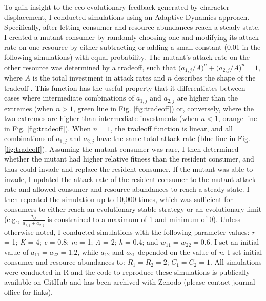 \documentclass[11pt,]{article}
\begin{document}
To gain insight to the eco-evolutionary feedback generated by character
displacement, I conducted simulations using an Adaptive Dynamics
approach. Specifically, after letting consumer and resource abundances
reach a steady state, I created a mutant consumer by randomly choosing
one and modifying its attack rate on one resource by either subtracting
or adding a small constant (0.01 in the following simulations) with
equal probability. The mutant's attack rate on the other resource was
determined by a tradeoff, such that
\(\big(a_{\text{1},j}/{A}\big)^n+\big(a_{\text{2},j}/{A}\big)^n=1\),
where \(A\) is the total investment in attack rates and \(n\) describes
the shape of the tradeoff \citep{Sargent2006}. This function has the
useful property that it differentiates between cases where intermediate
combinations of \(a_{\text{1},j}\) and \(a_{\text{2},j}\) are higher
than the extremes (when \(n>1\), green line in Fig. \ref{fig:tradeoff})
or, conversely, where the two extremes are higher than intermediate
investments (when \(n<1\), orange line in Fig. \ref{fig:tradeoff}). When
\(n=1\), the tradeoff function is linear, and all combinations of
\(a_{\text{1},j}\) and \(a_{\text{2},j}\) have the same total attack
rate (blue line in Fig. \ref{fig:tradeoff}). Assuming the mutant
consumer was rare, I then determined whether the mutant had higher
relative fitness than the resident consumer, and thus could invade and
replace the resident consumer. If the mutant was able to invade, I
updated the attack rate of the resident consumer to the mutant attack
rate and allowed consumer and resource abundances to reach a steady
state. I then repeated the simulation up to 10,000 times, which was
sufficient for consumers to either reach an evolutionary stable strategy
\citep[ESS,][]{Smith1973} or an evolutionary limit (e.g.,
\(\frac{a_{ij}}{a_{\text{1},j}+a_{\text{2},j}}\) is constrained to a
maximum of 1 and minimum of 0). Unless otherwise noted, I conducted
simulations with the following parameter values: \emph{r} = 1; \emph{K}
= 4; \emph{e} = 0.8; \emph{m} = 1; \emph{A} = 2; \emph{h} = 0.4; and
\(w_{11} = w_{22} = 0.6\). I set an initial value of
\(a_{11} = a_{22} = 1.2\), while \(a_{12}\) and \(a_{21}\) depended on
the value of \emph{n}. I set initial consumer and resource abundances
to: \(R_1 = R_2 = 2\); \(C_1 = C_2 = 1\). All simulations were conducted
in R \citep{R} and the code to reproduce these simulations is publically
available on GitHub and has been archived with Zenodo (please contact
journal office for links).
\end{document}
